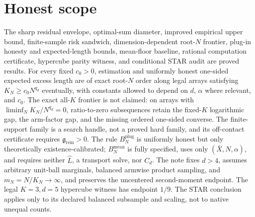 \documentclass{article}
\begin{document}
\section{Honest scope}

The sharp residual envelope, optimal-sum diameter, improved empirical upper bound, finite-sample risk sandwich, dimension-dependent root-\(N\) frontier, plug-in honesty and expected-length bounds, mean-floor baseline, rational computation certificate, hypercube parity witness, and conditional STAR audit are proved results.  For every fixed \(c_0>0\), estimation and uniformly honest one-sided expected excess length are of exact root-\(N\) order along legal arrays satisfying \(K_N\ge c_0N^{q_d}\) eventually, with constants allowed to depend on \(d\), \(\alpha\) where relevant, and \(c_0\).  The exact all-\(K\) frontier is not claimed: on arrays with \(\liminf_NK_N/N^{q_d}=0\), ratio-to-zero subsequences retain the fixed-\(K\) logarithmic gap, the arm-factor gap, and the missing ordered one-sided converse.  The finite-support family is a search handle, not a proved hard family, and its off-contact certificate requires \(\mathfrak g_{\mathrm{rem}}>0\).  The rule \(B_N^{\mathrm{plug}}\) is uniformly honest but only theoretically existence-calibrated; \(B_N^{\mathrm{mean}}\) is fully specified, uses only \((\bar X,N,\alpha)\), and requires neither \(\widehat L\), a transport solve, nor \(C_d\).  The note fixes \(d>4\), assumes arbitrary unit-ball marginals, balanced armwise product sampling, and \(m_N=N/K_N\to\infty\), and preserves the uncentered second-moment endpoint.  The legal \(K=3,d=5\) hypercube witness has endpoint \(1/9\).  The STAR conclusion applies only to its declared balanced subsample and scaling, not to native unequal counts.
\end{document}
